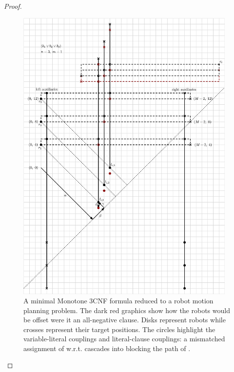 \begin{proof}
\begin{figure}[h]
	\centering
	\includegraphics[height=15cm]{ipe/minimal_ex.eps}
	\caption{
		A minimal Monotone 3CNF formula  reduced to a robot motion planning problem. The dark red graphics show how the robots would be offset were it an all-negative clause. Disks represent robots while crosses represent their target positions. The circles highlight the variable-literal couplings and literal-clause couplings: a mismatched assignment of  w.r.t.  cascades into  blocking the path of .
	}\label{fig:full_reduction}
\end{figure}



\end{proof}
